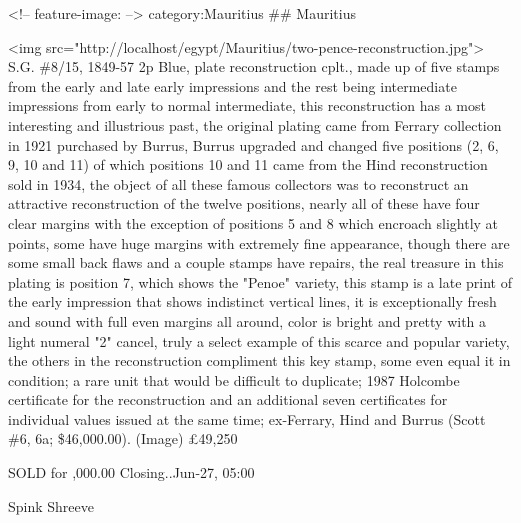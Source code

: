 
<!-- feature-image:  -->
category:Mauritius
\#\# Mauritius


<img src="http://localhost/egypt/Mauritius/two-pence-reconstruction.jpg"> 
S.G. \#8/15, 1849-57 2p Blue, plate reconstruction cplt., made up of five stamps from the early and late early impressions and the rest being intermediate impressions from early to normal intermediate, this reconstruction has a most interesting and illustrious past, the original plating came from Ferrary collection in 1921 purchased by Burrus, Burrus upgraded and changed five positions (2, 6, 9, 10 and 11) of which positions 10 and 11 came from the Hind reconstruction sold in 1934, the object of all these famous collectors was to reconstruct an attractive reconstruction of the twelve positions, nearly all of these have four clear margins with the exception of positions 5 and 8 which encroach slightly at points, some have huge margins with extremely fine appearance, though there are some small back flaws and a couple stamps have repairs, the real treasure in this plating is position 7, which shows the "Penoe" variety, this stamp is a late print of the early impression that shows indistinct vertical lines, it is exceptionally fresh and sound with full even margins all around, color is bright and pretty with a light numeral "2" cancel, truly a select example of this scarce and popular variety, the others in the reconstruction compliment this key stamp, some even equal it in condition; a rare unit that would be difficult to duplicate; 1987 Holcombe certificate for the reconstruction and an additional seven certificates for individual values issued at the same time; ex-Ferrary, Hind and Burrus (Scott \#6, 6a; \$46,000.00). (Image) 	£49,250

SOLD for ,000.00
Closing..Jun-27, 05:00 

Spink Shreeve  